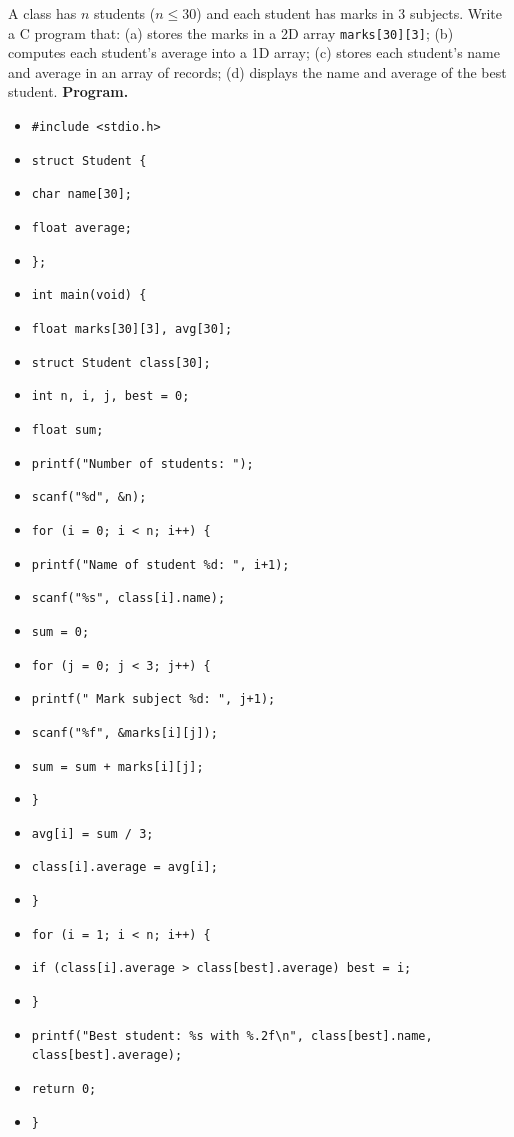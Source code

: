 \documentclass[11pt]{article}
\begin{document}
\begin{exoresolu}
A class has $n$ students ($n \le 30$) and each student has marks in 3 subjects. Write a C program that: (a) stores the marks in a 2D array \texttt{marks[30][3]}; (b) computes each student's average into a 1D array; (c) stores each student's name and average in an array of records; (d) displays the name and average of the best student.
\tcblower
\textbf{Program.}
\begin{itemize}
\item \texttt{\#include <stdio.h>}
\item \texttt{struct Student \{}
\item \texttt{\quad char name[30];}
\item \texttt{\quad float average;}
\item \texttt{\};}
\item \texttt{int main(void) \{}
\item \texttt{\quad float marks[30][3], avg[30];}
\item \texttt{\quad struct Student class[30];}
\item \texttt{\quad int n, i, j, best = 0;}
\item \texttt{\quad float sum;}
\item \texttt{\quad printf("Number of students: ");}
\item \texttt{\quad scanf("\%d", \&n);}
\item \texttt{\quad for (i = 0; i < n; i++) \{}
\item \texttt{\quad\quad printf("Name of student \%d: ", i+1);}
\item \texttt{\quad\quad scanf("\%s", class[i].name);}
\item \texttt{\quad\quad sum = 0;}
\item \texttt{\quad\quad for (j = 0; j < 3; j++) \{}
\item \texttt{\quad\quad\quad printf("  Mark subject \%d: ", j+1);}
\item \texttt{\quad\quad\quad scanf("\%f", \&marks[i][j]);}
\item \texttt{\quad\quad\quad sum = sum + marks[i][j];}
\item \texttt{\quad\quad \}}
\item \texttt{\quad\quad avg[i] = sum / 3;}
\item \texttt{\quad\quad class[i].average = avg[i];}
\item \texttt{\quad \}}
\item \texttt{\quad for (i = 1; i < n; i++) \{}
\item \texttt{\quad\quad if (class[i].average > class[best].average) best = i;}
\item \texttt{\quad \}}
\item \texttt{\quad printf("Best student: \%s with \%.2f\textbackslash n", class[best].name, class[best].average);}
\item \texttt{\quad return 0;}
\item \texttt{\}}
\end{itemize}


\end{exoresolu}
\end{document}
